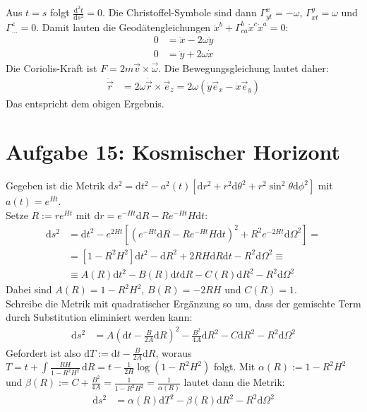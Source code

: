 \documentclass[a4paper,12pt]{article}
\newcommand{\kla}{}
\newcommand{\klam}{}
\newcommand{\tecxt}{}
\begin{document}
Aus $t=s$ folgt $\frac{\tecxt\text{d}^2t}{\tecxt\text{d}s^2}=0$. Die Christoffel-Symbole sind dann $\Gamma^x_{yt}=-\omega$, $\Gamma^y_{xt}=\omega$ und $\Gamma^z_{\dots}=0$. Damit lauten die Geodätengleichungen $\ddot{x}^b+\Gamma^b_{ca}\dot{x}^c\dot{x}^a=0$:
\begin{align*}
0&=\ddot{x} -2\omega\dot{y}\\
0&=\ddot{y} +2\omega\dot{x}
\end{align*}
Die Coriolis-Kraft ist $F=2m\vec{v}\times\vec{\omega}$. Die Bewegungsgleichung lautet daher:
\begin{align*}
\ddot{\vec{r}}&=2\omega\dot{\vec{r}}\times\vec{e}_z=2\omega\kla\left( {\dot{y}\vec{e}_x-\dot{x}\vec{e}_y} \right)
\end{align*}
Das entspricht dem obigen Ergebnis.
\section*{Aufgabe 15: Kosmischer Horizont}
Gegeben ist die Metrik $\tecxt\text{d}s^2=\tecxt\text{d}t^2-a^2(t)\klam\left[ {\tecxt\text{d}r^2+r^2\tecxt\text{d}\theta^2+r^2\sin^2\theta\tecxt\text{d}\phi^2} \right]$ mit $a(t)=e^{Ht}$.\\ 
Setze $R:=re^{Ht}$ mit $\tecxt\text{d}r=e^{-Ht}\tecxt\text{d}R-Re^{-Ht}H\tecxt\text{d}t$:
\begin{align*}
\tecxt\text{d}s^2&=\tecxt\text{d}t^2-e^{2Ht}\klam\left[ {\kla\left( {e^{-Ht}\tecxt\text{d}R - Re^{-Ht}H\tecxt\text{d}t} \right)^2+R^2e^{-2Ht}\tecxt\text{d}\Omega^2} \right]=\\
&=\klam\left[ {1-R^2H^2} \right]\tecxt\text{d}t^2-\tecxt\text{d}R^2+2RH\tecxt\text{d}R\tecxt\text{d}t-R^2\tecxt\text{d}\Omega^2\equiv\\
&\equiv A(R)\tecxt\text{d}t^2-B(R)\tecxt\text{d}t\tecxt\text{d}R-C(R)\tecxt\text{d}R^2-R^2 \tecxt\text{d}\Omega^2
\end{align*}
Dabei sind $A(R)=1-R^2H^2$, $B(R)=-2RH$ und $C(R)=1$.\\
Schreibe die Metrik mit quadratischer Ergänzung so um, dass der gemischte Term durch Substitution eliminiert werden kann:
\begin{align*}
\tecxt\text{d}s^2&=A\kla\left( {\tecxt\text{d}t-\frac{B}{2A}\tecxt\text{d}R} \right)^2-\frac{B^2}{4A}\tecxt\text{d}R^2-C\tecxt\text{d}R^2-R^2\tecxt\text{d}\Omega^2
\end{align*}
Gefordert ist also $\tecxt\text{d}T:=\tecxt\text{d}t-\frac{B}{2A}\tecxt\text{d}R$, woraus $T=t+\int\frac{RH}{1-R^2H^2}\,\tecxt\text{d}R=t-\frac{1}{2H}\log (1-R^2H^2)$ folgt. Mit $\alpha (R):=1-R^2H^2$ und $\beta (R):=C+\frac{B^2}{4A}=\frac{1}{1-R^2H^2}=\frac{1}{\alpha (R)}$ lautet dann die Metrik:
\begin{align*}
\tecxt\text{d}s^2&=\alpha(R)\tecxt\text{d}T^2-\beta (R)\tecxt\text{d}R^2-R^2\tecxt\text{d}\Omega^2
\end{align*}
\end{document}
